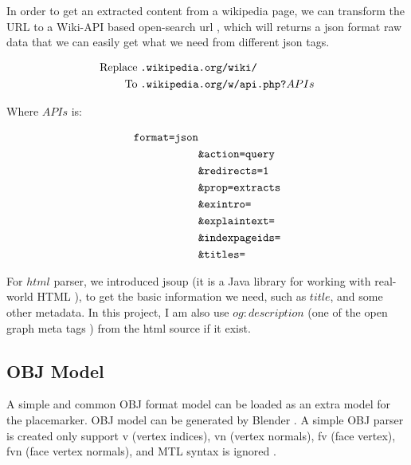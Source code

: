 In order to get an extracted content from a wikipedia page, we can transform the URL to a Wiki-API based open-search url \parencite{wiki.api.2016}, which will returns a json format raw data that we can easily get what we need from different json tags.

\[
\begin{array}{lr}
\begin{aligned}
\text{Replace}\;&\texttt{.wikipedia.org/wiki/}\\
\text{To}\;&\texttt{.wikipedia.org/w/api.php?}APIs\\
\end{aligned}
\end{array}
\]

Where $APIs$ is:

\[
\begin{array}{lr}
\begin{aligned}
\texttt{format=json}&\\
&\texttt{\&action=query}\\
&\texttt{\&redirects=1}\\
&\texttt{\&prop=extracts}\\
&\texttt{\&exintro=}\\
&\texttt{\&explaintext=}\\
&\texttt{\&indexpageids=}\\
&\texttt{\&titles=}\\
\end{aligned}
\end{array}
\]

For $html$ parser, we introduced jsoup (it is a Java library for working with real-world HTML \parencite{joup.2016}), to get the basic information we need, such as $title$, and some other metadata. In this project, I am also use $og:description$ (one of the open graph meta tags \parencite{ogp.2014}) from the html source if it exist.

\subsection{OBJ Model}
\label{section:obj-model}

A simple and common OBJ format model can be loaded as an extra model for the placemarker. OBJ model can be generated by Blender \parencite{blender.2016}.  A simple OBJ parser is created only support v (vertex indices), vn (vertex normals), fv (face vertex), fvn (face vertex normals), and MTL syntax is ignored \parencite{hwshen.obj-parser.2011}.

